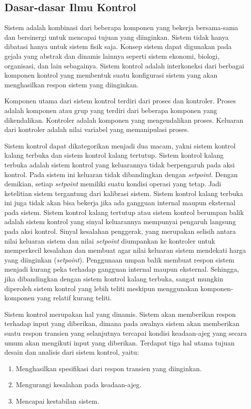 \subsection{Dasar-dasar Ilmu Kontrol}

Sistem adalah kombinasi dari beberapa komponen yang bekerja bersama-sama dan bersinergi untuk mencapai tujuan yang diinginkan. Sistem tidak hanya dibatasi hanya untuk sistem fisik saja. Konsep sistem dapat digunakan pada gejala yang abstrak dan dinamis lainnya seperti sistem ekonomi, biologi, organisasi, dan lain sebagainya. Sistem kontrol adalah interkoneksi dari berbagai komponen kontrol yang membentuk suatu konfigurasi sistem yang akan menghasilkan respon sistem yang diinginkan.

Komponen utama dari sistem kontrol terdiri dari proses dan kontroler. Proses adalah komponen atau grup yang terdiri dari beberapa komponen yang dikendalikan. Kontroler adalah komponen yang mengendalikan proses. Keluaran dari kontroler adalah nilai variabel yang memanipulasi proses.

Sistem kontrol dapat dikategorikan menjadi dua macam, yakni sistem kontrol kalang terbuka dan sistem kontrol kalang tertutup. Sistem kontrol kalang terbuka adalah sistem kontrol yang keluarannya tidak berpengaruh pada aksi kontrol. Pada sistem ini keluaran tidak dibandingkan dengan \textit{setpoint}. Dengan demikian, setiap \textit{setpoint} memiliki suatu kondisi operasi yang tetap. Jadi ketelitian sistem tergantung dari kalibrasi sistem. Sistem kontrol kalang terbuka ini juga tidak akan bisa bekerja jika ada gangguan internal maupun eksternal pada sistem. Sistem kontrol kalang tertutup atau sistem kontrol berumpan balik adalah sistem kontrol yang sinyal keluarannya mempunyai pengaruh langsung pada aksi kontrol. Sinyal kesalahan penggerak, yang merupakan selisih antara nilai keluaran sistem dan nilai \textit{setpoint} diumpankan ke kontroler untuk memperkecil kesalahan dan membuat agar nilai keluaran sistem mendekati harga yang diinginkan (\textit{setpoint}). Penggunaan umpan balik membuat respon sistem menjadi kurang peka terhadap gangguan internal maupun eksternal. Sehingga, jika dibandingkan dengan sistem kontrol kalang terbuka, sangat mungkin diperoleh sistem kontrol yang lebih teliti meskipun menggunakan komponen-komponen yang relatif kurang teliti. \cite{ControlSystemBook}

Sistem kontrol merupakan hal yang dinamis. Sistem akan memberikan respon terhadap input yang diberikan, dimana pada awalnya sistem akan memberikan suatu respon transien yang selanjutnya tercapai kondisi keadaan-ajeg yang secara umum akan mengikuti input yang diberikan. Terdapat tiga hal utama tujuan desain dan analisis dari sistem kontrol, yaitu: \cite{ControlSystemBook}
\begin{enumerate}
	\item Menghasilkan spesifikasi dari respon transien yang diinginkan.
	\item Mengurangi kesalahan pada keadaan-ajeg.
	\item Mencapai kestabilan sistem.
\end{enumerate}

